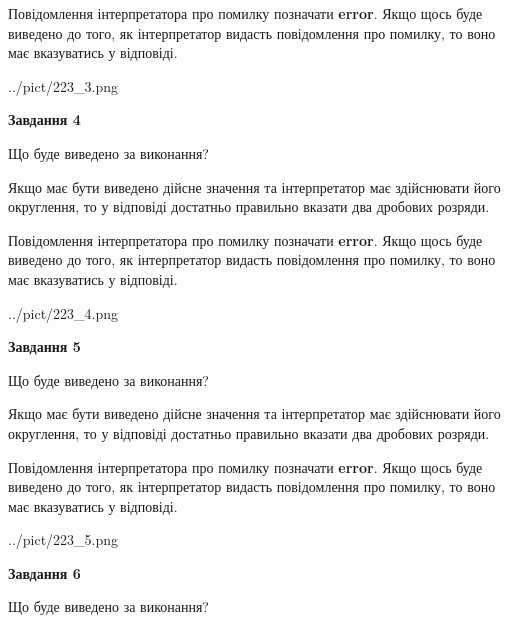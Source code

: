 \documentclass[12pt, ukrainian]{article}
\begin{document}
{\begin {Large}
Повідомлення інтерпретатора про помилку позначати \textbf{error}.
Якщо щось буде виведено до того, як інтерпретатор видасть повідомлення про помилку, 
то воно має вказуватись у відповіді. \par

\begin{center}
	{../pict/223_3.png}
\end{center}
\newpage

{\begin {center}\textbf{Завдання 4}\end {center}}\par
Що буде виведено за виконання? \par

Якщо має бути виведено дійсне значення та інтерпретатор має здійснювати його округлення, 
то у відповіді достатньо правильно вказати два дробових розряди.

Повідомлення інтерпретатора про помилку позначати \textbf{error}.
Якщо щось буде виведено до того, як інтерпретатор видасть повідомлення про помилку, 
то воно має вказуватись у відповіді. \par

\begin{center}
	{../pict/223_4.png}
\end{center}
\newpage

{\begin {center}\textbf{Завдання 5}\end {center}}\par
Що буде виведено за виконання? \par

Якщо має бути виведено дійсне значення та інтерпретатор має здійснювати його округлення, 
то у відповіді достатньо правильно вказати два дробових розряди.

Повідомлення інтерпретатора про помилку позначати \textbf{error}.
Якщо щось буде виведено до того, як інтерпретатор видасть повідомлення про помилку, 
то воно має вказуватись у відповіді. \par

\begin{center}
	{../pict/223_5.png}
\end{center}
\newpage

{\begin {center}\textbf{Завдання 6}\end {center}}\par
Що буде виведено за виконання? \par


\end{Large}}
\end{document}
